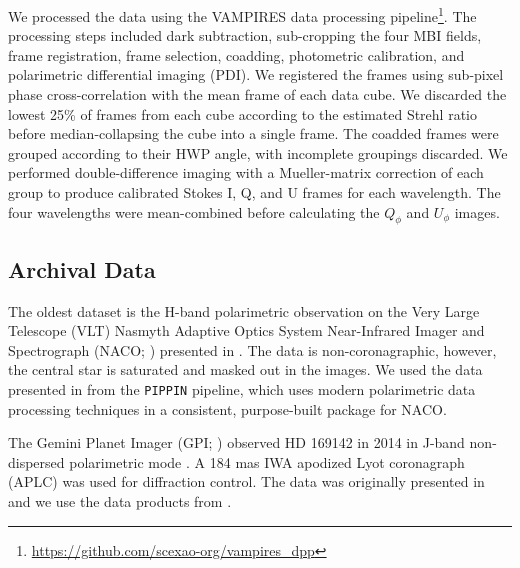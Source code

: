 We processed the data using the VAMPIRES data processing pipeline\footnote{\url{https://github.com/scexao-org/vampires_dpp}}. The processing steps included dark subtraction, sub-cropping the four MBI fields, frame registration, frame selection, coadding, photometric calibration, and polarimetric differential imaging (PDI). We registered the frames using sub-pixel phase cross-correlation \citep{guizar-sicairos_efficient_2008} with the mean frame of each data cube. We discarded the lowest 25\% of frames from each cube according to the estimated Strehl ratio before median-collapsing the cube into a single frame. The coadded frames were grouped according to their HWP angle, with incomplete groupings discarded. We performed double-difference imaging with a Mueller-matrix correction of each group to produce calibrated Stokes I, Q, and U frames for each wavelength. The four wavelengths were mean-combined before calculating the $Q_\phi$ and $U_\phi$ images.

\subsection{Archival Data\label{sec:obs_archive}}

The oldest dataset is the H-band polarimetric observation on the Very Large Telescope (VLT) Nasmyth Adaptive Optics System Near-Infrared Imager and Spectrograph (NACO; \citealp{quanz_very_2011}) presented in \citet{quanz_gaps_2013}. The data is non-coronagraphic, however, the central star is saturated and masked out in the images. We used the data presented in \citet{regt_polarimetric_2024} from the \texttt{PIPPIN} pipeline, which uses modern polarimetric data processing techniques in a consistent, purpose-built package for NACO.

The Gemini Planet Imager (GPI; \citealt{macintosh_first_2014}) observed HD 169142 in 2014 in J-band non-dispersed polarimetric mode \citep{perrin_polarimetry_2015}. A 184 mas IWA apodized Lyot coronagraph (APLC) was used for diffraction control. The data was originally presented in \citet{monnier_polarized_2017} and we use the data products from \citet{rich_gemini-lights_2022}.


